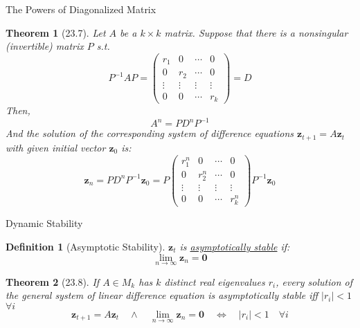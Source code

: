 \documentclass[a4paper,11pt]{article}
\newtheorem{defn}{Definition}
\newtheorem{thm}{Theorem}
\newcommand{\bd}{\mathbf}
\begin{document}
\begin{frame}[t]{The Powers of Diagonalized Matrix}
	\begin{thm}
		[23.7]
		Let $A$ be a $k\times k$ matrix. Suppose that there is a nonsingular (invertible) matrix $P$ s.t. \[
			P^{-1}AP = \begin{pmatrix}
				r_1 & 0 & \cdots & 0\\
				0 & r_2 & \cdots & 0\\
				\vdots & \vdots & \vdots & \vdots\\
				0 & 0 & \cdots & r_k
			\end{pmatrix}=D \tag{Jordan Canonical Form}
		\] Then, \[
			A^n = P D^n P^{-1}
		\] And the solution of the corresponding system of difference equations $\bd{z}_{t+1}=A\bd{z}_t$ with given initial vector $\bd{z}_0$ is:
		\[
			\bd{z}_n = P D^n P^{-1} \bd{z}_0 = P \begin{pmatrix}
				r_1^n & 0 & \cdots & 0\\
				0 & r_2^n & \cdots & 0\\
				\vdots & \vdots & \vdots & \vdots\\
				0 & 0 & \cdots & r_k^n
			\end{pmatrix} P^{-1} \bd{z}_0
		\]
		
	\end{thm}
\end{frame}

\begin{frame}[t]{Dynamic Stability}
	\begin{defn}
		[Asymptotic Stability] $\bd{z}_t$ is \uline{asymptotically stable} if:\[
			\lim_{n\rightarrow\infty} \bd{z}_n = \bd{0}
		\]
	\end{defn}
	\begin{thm}
		[23.8] If $A\in M_k$ has $k$ distinct real eigenvalues $r_i$, every solution of the general system of linear difference equation is asymptotically stable iff $|r_i|<1$ $\forall i$\[
			\bd{z}_{t+1}=A\bd{z}_t\quad\land\quad\lim_{n\rightarrow\infty} \bd{z}_n = \bd{0} \quad\iff\quad |r_i|<1 \quad \forall i
		\]
	\end{thm}
\end{frame}
\end{document}
